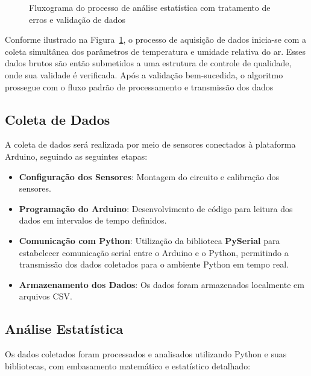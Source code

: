 \documentclass[12pt, a4paper]{article}
\begin{document}
\begin{figure}[!ht]
    \caption{Fluxograma do processo de análise estatística com tratamento de erros e validação de dados}
    \label{fig:fluxograma_estatistico}
\end{figure}

Conforme ilustrado na Figura~\ref{fig:fluxograma_estatistico}, o processo de aquisição de dados inicia-se com a coleta simultânea
dos parâmetros de temperatura e umidade relativa do ar. Esses dados brutos são então submetidos a uma estrutura de
controle de qualidade, onde sua validade é verificada. Após a validação bem-sucedida, o algoritmo prossegue com o fluxo
padrão de processamento e transmissão dos dados

\subsection{Coleta de Dados}
A coleta de dados será realizada por meio de sensores conectados à plataforma Arduino, seguindo as seguintes etapas:
\begin{itemize}
    \item \textbf{Configuração dos Sensores}: Montagem do circuito e calibração dos sensores.
    \item \textbf{Programação do Arduino}: Desenvolvimento de código para leitura dos dados em intervalos de tempo definidos.
    \item \textbf{Comunicação com Python}: Utilização da biblioteca \textbf{PySerial} para estabelecer comunicação serial entre o Arduino e o Python, permitindo a transmissão dos dados coletados para o ambiente Python em tempo real.
    \item \textbf{Armazenamento dos Dados}: Os dados foram  armazenados localmente em arquivos CSV.
\end{itemize}

\subsection{Análise Estatística }
Os dados coletados foram processados e analisados utilizando Python e suas bibliotecas, com embasamento matemático e
estatístico detalhado:
\end{document}
